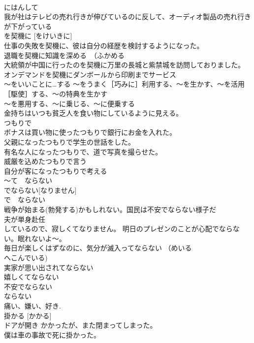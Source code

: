 \documentclass[8pt]{extreport}
\begin{document}
\begin{CJK}{UTF8}{min}
\\	にはんして 
\\	我が社はテレビの売れ行きが伸びているのに反して、オーディオ製品の売れ行きが下がっている
\\	を契機に [をけいきに]	
\\	仕事の失敗を契機に、彼は自分の経歴を検討するようになった。 
\\	退職を契機に知識を深める　（ふかめる　
\\	大統領が中国に行ったのを契機に万里の長城と紫禁城を訪問しておりました。 
\\	オンデマンドを契機にダンボールから印刷までサービス 
\\	～をいいことに…する ～をうまく［巧みに］利用する、～を生かす、～を活用［駆使］する、～の特典を生かす 
\\	～を悪用する、～に乗じる、～に便乗する 
\\	金持ちはいつも貧乏人を食い物にしているように見える。
\\	つもりで	
\\	ボナスは買い物に使ったつもりで銀行にお金を入れた。 
\\	父親になったつもりで学生の世話をした。 
\\	有名な人になったつもりで、道で写真を撮らせた。 
\\	威厳を込めたつもりで言う 
\\	自分が客になったつもりで考える 
\\	～て　ならない 
\\	でならない[なりません] 
\\	で　ならない
\\	戦争が始まる(勃発する)かもしれない。国民は不安でならない様子だ 
\\	夫が単身赴任
\\	しているので、寂しくてなりません。 明日のプレゼンのことが心配でならない。眠れないよ～。 
\\	毎日が楽しくはずなのに、気分が滅入ってならない （めいる 
\\	へこんでいる) 
\\	実家が思い出されてならない 
\\	嬉しくてならない　
\\	不安でならない　
\\	ならない 
\\	痛い、嫌い、好き.	
\\	掛かる [かかる]	
\\	ドアが開き かかったが、また閉まってしまった。 
\\	僕は車の事故で死に掛かった。 

\end{CJK}
\end{document}
